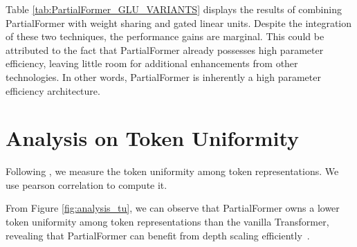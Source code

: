 \documentclass[11pt]{article}
\begin{document}
Table \ref{tab:PartialFormer_GLU_VARIANTS} displays the results of combining PartialFormer with weight sharing and gated linear units. Despite the integration of these two techniques, the performance gains are marginal. This could be attributed to the fact that PartialFormer already possesses high parameter efficiency, leaving little room for additional enhancements from other technologies. In other words, PartialFormer is inherently a high parameter efficiency architecture.



\section{Analysis on Token Uniformity}
\label{sec:analysis_tu}
Following \cite{Dong2021PureAttention, Wang2022AntiOversmoothing}, we measure the token uniformity among token representations. We use pearson correlation to compute it.


From Figure \ref{fig:analysis_tu}, we can observe that PartialFormer owns a lower token uniformity among token representations than the vanilla Transformer, revealing that PartialFormer can benefit from depth scaling efficiently~\cite{Dong2021PureAttention, Wang2022AntiOversmoothing}.



\begin{table}[t!]
    \centering
    \renewcommand{\arraystretch}{1}
\centering
\small
\setlength{\tabcolsep}{2pt}

\caption{Results of PartialFormer variants on the En-De task.}
\label{tab:PartialFormer_GLU_VARIANTS}
\end{table}
\end{document}
